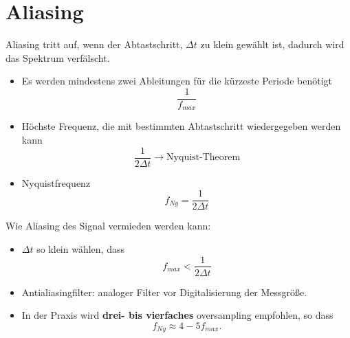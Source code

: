 \section{Aliasing}
Aliasing tritt auf, wenn der Abtastschritt, $\Delta t$ zu klein gewählt ist, dadurch wird das Spektrum verfälscht.
\begin{itemize}
\item Es werden mindestens zwei Ableitungen für die kürzeste Periode benötigt
\[
\frac{1}{f_{max}}
\]
\item Höchste Frequenz, die mit bestimmten Abtastschritt wiedergegeben werden kann
\[
\frac{1}{2\Delta t} \rightarrow \mbox{Nyquist-Theorem}
\]
\item Nyquistfrequenz
\[
f_{Ny}=\frac{1}{2 \Delta t}
\]
\end {itemize}
Wie Aliasing des Signal vermieden werden kann:
\begin{itemize}
\item $\Delta t$ so klein wählen, dass
\[
f_{max} < \frac {1}{2\Delta t}
\]
\item Antialiasingfilter: analoger Filter vor Digitalisierung der Messgröße.
\item In der Praxis wird \textbf{drei- bis vierfaches} oversampling empfohlen, so dass
\[
f_{Ny}\approx 4-5 f_{max}.
\]
\end {itemize}